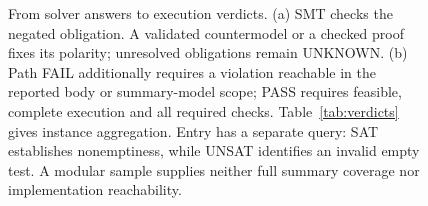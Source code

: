 \begin{figure}[t]
\centering

\caption{From solver answers to execution verdicts. (a) SMT checks the
negated obligation. A validated countermodel or a checked proof fixes its
polarity; unresolved obligations remain UNKNOWN. (b) Path FAIL additionally
requires a violation reachable in the reported body or summary-model scope; PASS requires feasible, complete execution
and all required checks. Table~\ref{tab:verdicts} gives instance aggregation.
Entry has a separate query: SAT establishes nonemptiness, while UNSAT
identifies an invalid empty test. A modular sample supplies neither full
summary coverage nor implementation reachability.}
\label{fig:result-flow}
\end{figure}
